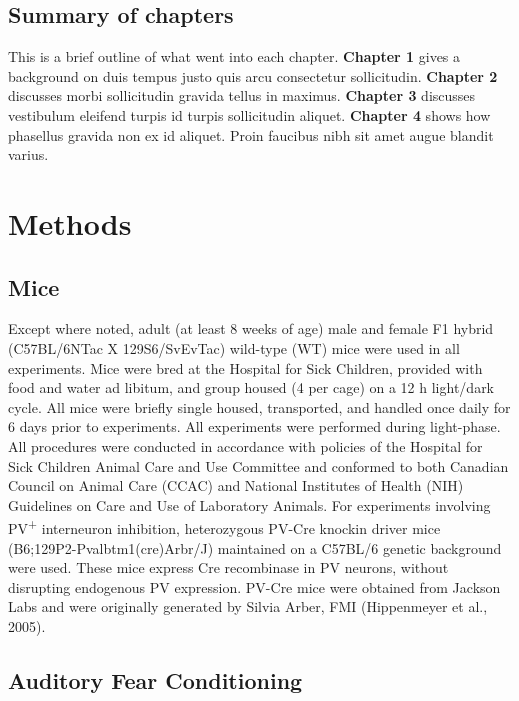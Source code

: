 \documentclass[12pt,a4paper,]{report}
\begin{document}
\section{Summary of chapters}\label{summary-of-chapters}

This is a brief outline of what went into each chapter. \textbf{Chapter
1} gives a background on duis tempus justo quis arcu consectetur
sollicitudin. \textbf{Chapter 2} discusses morbi sollicitudin gravida
tellus in maximus. \textbf{Chapter 3} discusses vestibulum eleifend
turpis id turpis sollicitudin aliquet. \textbf{Chapter 4} shows how
phasellus gravida non ex id aliquet. Proin faucibus nibh sit amet augue
blandit varius.

\chapter{Methods}\label{methods}

\section{Mice}\label{mice}

Except where noted, adult (at least 8 weeks of age) male and female F1
hybrid (C57BL/6NTac X 129S6/SvEvTac) wild-type (WT) mice were used in
all experiments. Mice were bred at the Hospital for Sick Children,
provided with food and water ad libitum, and group housed (4 per cage)
on a 12 h light/dark cycle. All mice were briefly single housed,
transported, and handled once daily for 6 days prior to experiments. All
experiments were performed during light-phase. All procedures were
conducted in accordance with policies of the Hospital for Sick Children
Animal Care and Use Committee and conformed to both Canadian Council on
Animal Care (CCAC) and National Institutes of Health (NIH) Guidelines on
Care and Use of Laboratory Animals. For experiments involving
PV\textsuperscript{+} interneuron inhibition, heterozygous PV-Cre
knockin driver mice (B6;129P2-Pvalbtm1(cre)Arbr/J) maintained on a
C57BL/6 genetic background were used. These mice express Cre recombinase
in PV neurons, without disrupting endogenous PV expression. PV-Cre mice
were obtained from Jackson Labs and were originally generated by Silvia
Arber, FMI (Hippenmeyer et al., 2005).

\section{Auditory Fear Conditioning}\label{auditory-fear-conditioning}
\end{document}
